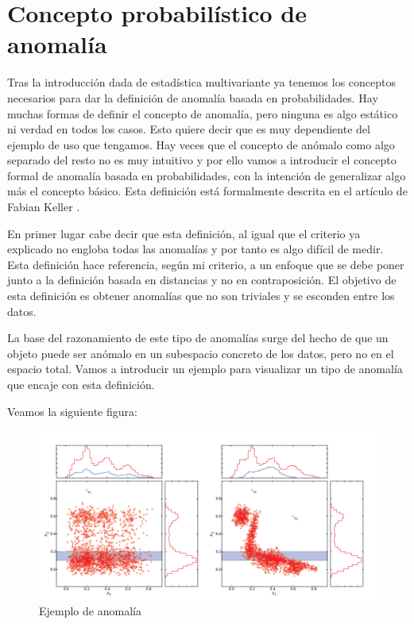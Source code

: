 \chapter{Concepto probabilístico de anomalía}
\label{chapter:anomalia_probabilidad}

Tras la introducción dada de estadística multivariante ya tenemos los conceptos necesarios para dar la definición de anomalía basada en probabilidades. Hay muchas formas de definir el concepto de anomalía, pero ninguna es algo estático ni verdad en todos los casos. Esto quiere decir que es muy dependiente del ejemplo de uso que tengamos. Hay veces que el concepto de anómalo como algo separado del resto no es muy intuitivo y por ello vamos a introducir el concepto formal de anomalía basada en probabilidades, con la intención de generalizar algo más el concepto básico. Esta definición está formalmente descrita en el artículo de Fabian Keller \cite{fabian_keller_hics_2012}.

En primer lugar cabe decir que esta definición, al igual que el criterio ya explicado no engloba todas las anomalías y por tanto es algo difícil de medir. Esta definición hace referencia, según mi criterio, a un enfoque que se debe poner junto a la definición basada en distancias y no en contraposición. El objetivo de esta definición es obtener anomalías que no son triviales y se esconden entre los datos.

La base del razonamiento de este tipo de anomalías surge del hecho de que un objeto puede ser anómalo en un subespacio concreto de los datos, pero no en el espacio total. Vamos a introducir un ejemplo para visualizar un tipo de anomalía que encaje con esta definición.

Veamos la siguiente figura:

\begin{figure}[H]
	\centering
	\label{ejemplo_anomalia_probabilidad}
	\includegraphics[scale=0.6]{imagenes/ejemplo_anomalia_probabilidad}
	\caption{Ejemplo de anomalía \cite{fabian_keller_hics:_2012}}
\end{figure}

